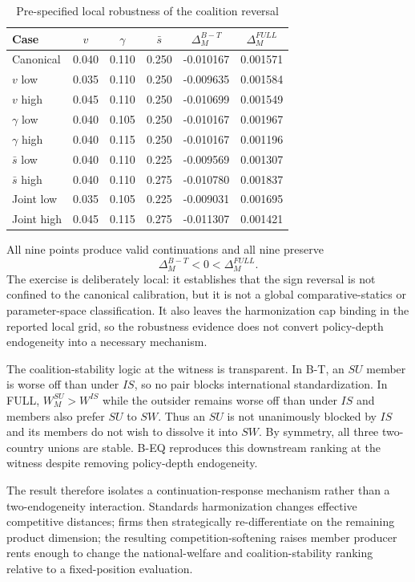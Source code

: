 \begin{table}[htbp]
\centering
\caption{Pre-specified local robustness of the coalition reversal}\label{tab:local-robustness}
\begin{tabular}{lccccc}
\toprule
Case & $v$ & $\gamma$ & $\bar s$ & $\Delta_M^{B-T}$ & $\Delta_M^{FULL}$ \\
\midrule
Canonical   & 0.040 & 0.110 & 0.250 & -0.010167 & 0.001571 \\
$v$ low     & 0.035 & 0.110 & 0.250 & -0.009635 & 0.001584 \\
$v$ high    & 0.045 & 0.110 & 0.250 & -0.010699 & 0.001549 \\
$\gamma$ low  & 0.040 & 0.105 & 0.250 & -0.010167 & 0.001967 \\
$\gamma$ high & 0.040 & 0.115 & 0.250 & -0.010167 & 0.001196 \\
$\bar s$ low  & 0.040 & 0.110 & 0.225 & -0.009569 & 0.001307 \\
$\bar s$ high & 0.040 & 0.110 & 0.275 & -0.010780 & 0.001837 \\
Joint low   & 0.035 & 0.105 & 0.225 & -0.009031 & 0.001695 \\
Joint high  & 0.045 & 0.115 & 0.275 & -0.011307 & 0.001421 \\
\bottomrule
\end{tabular}
\end{table}

All nine points produce valid continuations and all nine preserve
\[
\Delta_M^{B-T}<0<\Delta_M^{FULL}.
\]
The exercise is deliberately local: it establishes that the sign reversal is not confined to the canonical calibration, but it is not a global comparative-statics or parameter-space classification. It also leaves the harmonization cap binding in the reported local grid, so the robustness evidence does not convert policy-depth endogeneity into a necessary mechanism.

The coalition-stability logic at the witness is transparent. In B-T, an $SU$ member is worse off than under $IS$, so no pair blocks international standardization. In FULL, $W_M^{SU}>W^{IS}$ while the outsider remains worse off than under $IS$ and members also prefer $SU$ to $SW$. Thus an $SU$ is not unanimously blocked by $IS$ and its members do not wish to dissolve it into $SW$. By symmetry, all three two-country unions are stable. B-EQ reproduces this downstream ranking at the witness despite removing policy-depth endogeneity.

The result therefore isolates a continuation-response mechanism rather than a two-endogeneity interaction. Standards harmonization changes effective competitive distances; firms then strategically re-differentiate on the remaining product dimension; the resulting competition-softening raises member producer rents enough to change the national-welfare and coalition-stability ranking relative to a fixed-position evaluation.

